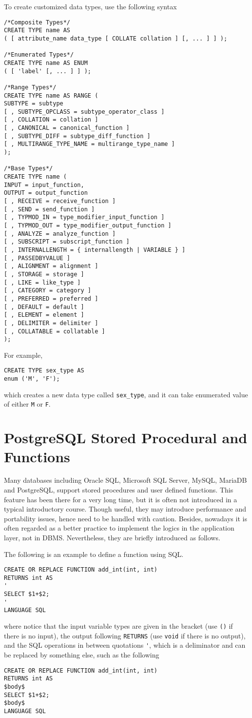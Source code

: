 To create customized data types, use the following syntax
\begin{lstlisting}
/*Composite Types*/
CREATE TYPE name AS
( [ attribute_name data_type [ COLLATE collation ] [, ... ] ] );

/*Enumerated Types*/
CREATE TYPE name AS ENUM
( [ 'label' [, ... ] ] );

/*Range Types*/
CREATE TYPE name AS RANGE (
SUBTYPE = subtype
[ , SUBTYPE_OPCLASS = subtype_operator_class ]
[ , COLLATION = collation ]
[ , CANONICAL = canonical_function ]
[ , SUBTYPE_DIFF = subtype_diff_function ]
[ , MULTIRANGE_TYPE_NAME = multirange_type_name ]
);

/*Base Types*/
CREATE TYPE name (
INPUT = input_function,
OUTPUT = output_function
[ , RECEIVE = receive_function ]
[ , SEND = send_function ]
[ , TYPMOD_IN = type_modifier_input_function ]
[ , TYPMOD_OUT = type_modifier_output_function ]
[ , ANALYZE = analyze_function ]
[ , SUBSCRIPT = subscript_function ]
[ , INTERNALLENGTH = { internallength | VARIABLE } ]
[ , PASSEDBYVALUE ]
[ , ALIGNMENT = alignment ]
[ , STORAGE = storage ]
[ , LIKE = like_type ]
[ , CATEGORY = category ]
[ , PREFERRED = preferred ]
[ , DEFAULT = default ]
[ , ELEMENT = element ]
[ , DELIMITER = delimiter ]
[ , COLLATABLE = collatable ]
);
\end{lstlisting}
For example,
\begin{lstlisting}
CREATE TYPE sex_type AS
enum ('M', 'F');
\end{lstlisting}
which creates a new data type called \verb|sex_type|, and it can take enumerated value of either \verb|M| or \verb|F|.

\section{PostgreSQL Stored Procedural and Functions}

Many databases including Oracle SQL, Microsoft SQL Server, MySQL, MariaDB and PostgreSQL, support stored procedures and user defined functions. This feature has been there for a very long time, but it is often not introduced in a typical introductory course. Though useful, they may introduce performance and portability issues, hence need to be handled with caution. Besides, nowadays it is often regarded as a better practice to implement the logics in the application layer, not in DBMS. Nevertheless, they are briefly introduced as follows.

The following is an example to define a function using SQL.
\begin{lstlisting}
CREATE OR REPLACE FUNCTION add_int(int, int)
RETURNS int AS
'
SELECT $1+$2;
'
LANGUAGE SQL
\end{lstlisting}
where notice that the input variable types are given in the bracket (use \verb|()| if there is no input), the output following \verb|RETURNS| (use \verb|void| if there is no output), and the SQL operations in between quotations \verb|'|, which is a deliminator and can be replaced by something else, such as the following
\begin{lstlisting}
CREATE OR REPLACE FUNCTION add_int(int, int)
RETURNS int AS
$body$
SELECT $1+$2;
$body$
LANGUAGE SQL
\end{lstlisting}

